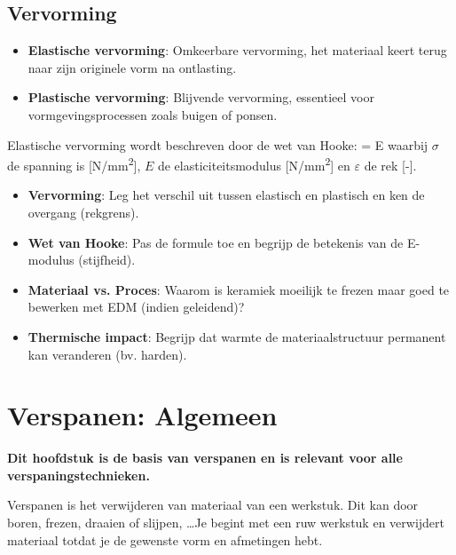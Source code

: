 \documentclass[a4paper,11pt,twoside]{report}
\begin{document}
\section{Vervorming}

\begin{conceptbox}[Vervormingsmodi]
    \begin{itemize}
        \item \textbf{Elastische vervorming}: Omkeerbare vervorming, het materiaal keert terug naar zijn originele vorm na ontlasting.
        \item \textbf{Plastische vervorming}: Blijvende vervorming, essentieel voor vormgevingsprocessen zoals buigen of ponsen.
    \end{itemize}
\end{conceptbox}

Elastische vervorming wordt beschreven door de wet van Hooke:
{\sigma = E \cdot \varepsilon}
{waarbij $\sigma$ de spanning is [\si{N/mm^2}], $E$ de elasticiteitsmodulus [\si{N/mm^2}] en $\varepsilon$ de rek [-].}

\begin{warningbox}
    \begin{itemize}
        \item \textbf{Vervorming}: Leg het verschil uit tussen elastisch en plastisch en ken de overgang (rekgrens).
        \item \textbf{Wet van Hooke}: Pas de formule toe en begrijp de betekenis van de E-modulus (stijfheid).
        \item \textbf{Materiaal vs. Proces}: Waarom is keramiek moeilijk te frezen maar goed te bewerken met EDM (indien geleidend)?
        \item \textbf{Thermische impact}: Begrijp dat warmte de materiaalstructuur permanent kan veranderen (bv. harden).
    \end{itemize}
\end{warningbox}

\chapter{Verspanen: Algemeen}
\label{chap:Algemeen verspanen}
\textbf{Dit hoofdstuk is de basis van verspanen en is relevant voor alle verspaningstechnieken.}

Verspanen is het verwijderen van materiaal van een werkstuk. Dit kan door boren, frezen, draaien of slijpen,
\ldots Je begint met een ruw werkstuk en verwijdert materiaal totdat je de gewenste vorm en afmetingen hebt.
\end{document}
